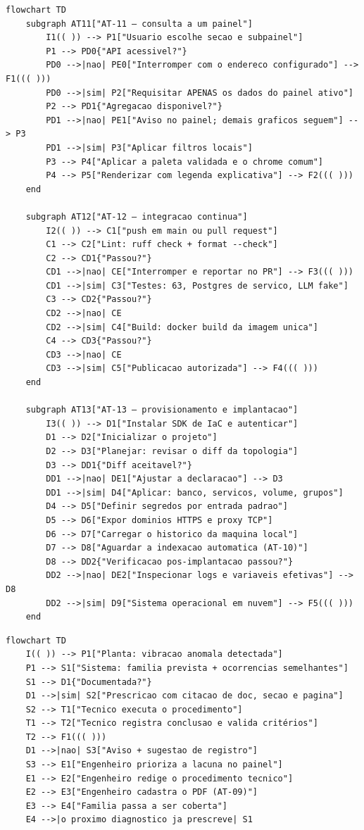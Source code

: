 \begin{lstlisting}[language=mermaid, caption={AT-11, AT-12 e AT-13 --- painel, integração contínua e implantação}, label={lst:mmat111213}]
flowchart TD
    subgraph AT11["AT-11 — consulta a um painel"]
        I1(( )) --> P1["Usuario escolhe secao e subpainel"]
        P1 --> PD0{"API acessivel?"}
        PD0 -->|nao| PE0["Interromper com o endereco configurado"] --> F1((( )))
        PD0 -->|sim| P2["Requisitar APENAS os dados do painel ativo"]
        P2 --> PD1{"Agregacao disponivel?"}
        PD1 -->|nao| PE1["Aviso no painel; demais graficos seguem"] --> P3
        PD1 -->|sim| P3["Aplicar filtros locais"]
        P3 --> P4["Aplicar a paleta validada e o chrome comum"]
        P4 --> P5["Renderizar com legenda explicativa"] --> F2((( )))
    end

    subgraph AT12["AT-12 — integracao continua"]
        I2(( )) --> C1["push em main ou pull request"]
        C1 --> C2["Lint: ruff check + format --check"]
        C2 --> CD1{"Passou?"}
        CD1 -->|nao| CE["Interromper e reportar no PR"] --> F3((( )))
        CD1 -->|sim| C3["Testes: 63, Postgres de servico, LLM fake"]
        C3 --> CD2{"Passou?"}
        CD2 -->|nao| CE
        CD2 -->|sim| C4["Build: docker build da imagem unica"]
        C4 --> CD3{"Passou?"}
        CD3 -->|nao| CE
        CD3 -->|sim| C5["Publicacao autorizada"] --> F4((( )))
    end

    subgraph AT13["AT-13 — provisionamento e implantacao"]
        I3(( )) --> D1["Instalar SDK de IaC e autenticar"]
        D1 --> D2["Inicializar o projeto"]
        D2 --> D3["Planejar: revisar o diff da topologia"]
        D3 --> DD1{"Diff aceitavel?"}
        DD1 -->|nao| DE1["Ajustar a declaracao"] --> D3
        DD1 -->|sim| D4["Aplicar: banco, servicos, volume, grupos"]
        D4 --> D5["Definir segredos por entrada padrao"]
        D5 --> D6["Expor dominios HTTPS e proxy TCP"]
        D6 --> D7["Carregar o historico da maquina local"]
        D7 --> D8["Aguardar a indexacao automatica (AT-10)"]
        D8 --> DD2{"Verificacao pos-implantacao passou?"}
        DD2 -->|nao| DE2["Inspecionar logs e variaveis efetivas"] --> D8
        DD2 -->|sim| D9["Sistema operacional em nuvem"] --> F5((( )))
    end
\end{lstlisting}

\begin{lstlisting}[language=mermaid, caption={AT-14 --- ciclo de tratamento de lacuna documental}, label={lst:mmat14}]
flowchart TD
    I(( )) --> P1["Planta: vibracao anomala detectada"]
    P1 --> S1["Sistema: familia prevista + ocorrencias semelhantes"]
    S1 --> D1{"Documentada?"}
    D1 -->|sim| S2["Prescricao com citacao de doc, secao e pagina"]
    S2 --> T1["Tecnico executa o procedimento"]
    T1 --> T2["Tecnico registra conclusao e valida critérios"]
    T2 --> F1((( )))
    D1 -->|nao| S3["Aviso + sugestao de registro"]
    S3 --> E1["Engenheiro prioriza a lacuna no painel"]
    E1 --> E2["Engenheiro redige o procedimento tecnico"]
    E2 --> E3["Engenheiro cadastra o PDF (AT-09)"]
    E3 --> E4["Familia passa a ser coberta"]
    E4 -->|o proximo diagnostico ja prescreve| S1
\end{lstlisting}

